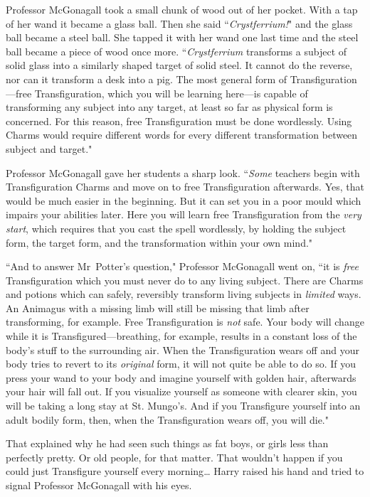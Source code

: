 Professor McGonagall took a small chunk of wood out of her pocket. With a tap of her wand it became a glass ball. Then she said ``\emph{Crystferrium!}" and the glass ball became a steel ball. She tapped it with her wand one last time and the steel ball became a piece of wood once more. ``\emph{Crystferrium} transforms a subject of solid glass into a similarly shaped target of solid steel. It cannot do the reverse, nor can it transform a desk into a pig. The most general form of Transfiguration—free Transfiguration, which you will be learning here—is capable of transforming any subject into any target, at least so far as physical form is concerned. For this reason, free Transfiguration must be done wordlessly. Using Charms would require different words for every different transformation between subject and target."

Professor McGonagall gave her students a sharp look. ``\emph{Some} teachers begin with Transfiguration Charms and move on to free Transfiguration afterwards. Yes, that would be much easier in the beginning. But it can set you in a poor mould which impairs your abilities later. Here you will learn free Transfiguration from the \emph{very start}, which requires that you cast the spell wordlessly, by holding the subject form, the target form, and the transformation within your own mind."

``And to answer Mr~Potter's question," Professor McGonagall went on, ``it is \emph{free} Transfiguration which you must never do to any living subject. There are Charms and potions which can safely, reversibly transform living subjects in \emph{limited} ways. An Animagus with a missing limb will still be missing that limb after transforming, for example. Free Transfiguration is \emph{not} safe. Your body will change while it is Transfigured—breathing, for example, results in a constant loss of the body's stuff to the surrounding air. When the Transfiguration wears off and your body tries to revert to its \emph{original} form, it will not quite be able to do so. If you press your wand to your body and imagine yourself with golden hair, afterwards your hair will fall out. If you visualize yourself as someone with clearer skin, you will be taking a long stay at St. Mungo's. And if you Transfigure yourself into an adult bodily form, then, when the Transfiguration wears off, you will die."

That explained why he had seen such things as fat boys, or girls less than perfectly pretty. Or old people, for that matter. That wouldn't happen if you could just Transfigure yourself every morning{\ldots} Harry raised his hand and tried to signal Professor McGonagall with his eyes.

